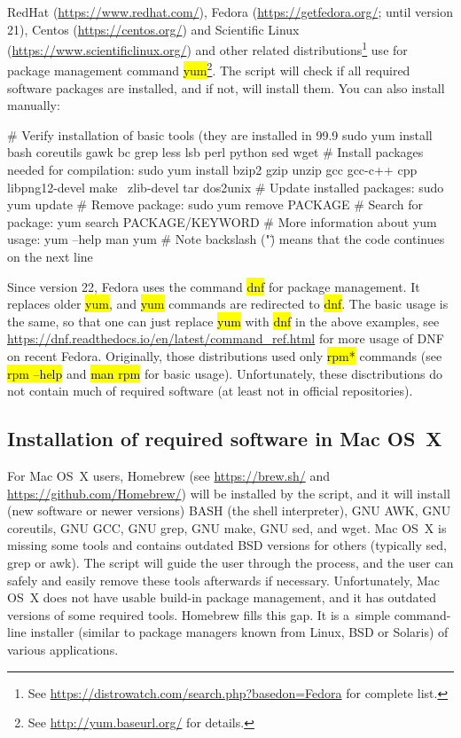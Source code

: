 \documentclass[a4paper, 11pt, twoside]{article}
\renewcommand{\texttt}[1]{\hl{\ttfamily #1}}
\begin{document}
RedHat (\url{https://www.redhat.com/}), Fedora (\url{https://getfedora.org/}; until version 21), Centos (\url{https://centos.org/}) and Scientific Linux (\url{https://www.scientificlinux.org/}) and other related distributions\footnote{See \url{https://distrowatch.com/search.php?basedon=Fedora} for complete list.} use for package management command \texttt{yum}\footnote{See \url{http://yum.baseurl.org/} for details.}. The script will check if all required software packages are installed, and if not, will install them. You can also install manually:

\begin{bashcode}
  # Verify installation of basic tools (they are installed in 99.9%
  sudo yum install bash coreutils gawk bc grep less lsb perl python sed wget
  # Install packages needed for compilation:
  sudo yum install bzip2 gzip unzip gcc gcc-c++ cpp libpng12-devel make \
    zlib-devel tar dos2unix
  # Update installed packages:
  sudo yum update
  # Remove package:
  sudo yum remove PACKAGE
  # Search for package:
  yum search PACKAGE/KEYWORD
  # More information about yum usage:
  yum --help
  man yum
  # Note backslash ("\") means that the code continues on the next line
\end{bashcode}

Since version 22, Fedora uses the command \texttt{dnf} for package management. It replaces older \texttt{yum}, and \texttt{yum} commands are redirected to \texttt{dnf}. The basic usage is the same, so that one can just replace \texttt{yum} with \texttt{dnf} in the above examples, see \url{https://dnf.readthedocs.io/en/latest/command_ref.html} for more usage of DNF on recent Fedora. Originally, those distributions used only \texttt{rpm*} commands (see \texttt{rpm --help} and \texttt{man rpm} for basic usage). Unfortunately, these disctributions do not contain much of required software (at least not in official repositories).

\subsection{Installation of required software in Mac OS~X}
\label{required-mac}

For Mac OS~X users, Homebrew (see \url{https://brew.sh/} and \url{https://github.com/Homebrew/}) will be installed by the script, and it will install (new software or newer versions) BASH (the shell interpreter), GNU AWK, GNU coreutils, GNU GCC, GNU grep, GNU make, GNU sed, and wget. Mac OS~X is missing some tools and contains outdated BSD versions for others (typically sed, grep or awk). The script will guide the user through the process, and the user can safely and easily remove these tools afterwards if necessary. Unfortunately, Mac OS~X does not have usable build-in package management, and it has outdated versions of some required tools. Homebrew fills this gap. It is a~simple command-line installer (similar to package managers known from Linux, BSD or Solaris) of various applications.
\end{document}
